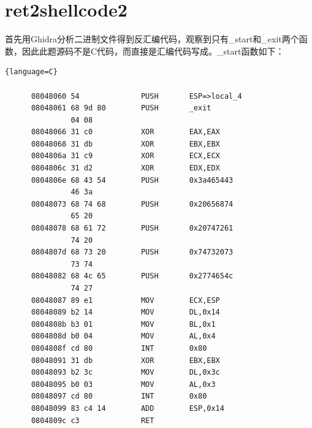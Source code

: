 \documentclass{article}
\begin{document}
\section{ret2shellcode2}
    首先用Ghidra分析二进制文件得到反汇编代码，观察到只有\_start和\_exit两个函数，因此此题源码不是C代码，而直接是汇编代码写成。\_start函数如下：
    	\begin{lstlisting}{language=C}
   
      08048060 54              PUSH       ESP=>local_4
      08048061 68 9d 80        PUSH       _exit
               04 08
      08048066 31 c0           XOR        EAX,EAX
      08048068 31 db           XOR        EBX,EBX
      0804806a 31 c9           XOR        ECX,ECX
      0804806c 31 d2           XOR        EDX,EDX
      0804806e 68 43 54        PUSH       0x3a465443
               46 3a
      08048073 68 74 68        PUSH       0x20656874
               65 20
      08048078 68 61 72        PUSH       0x20747261
               74 20
      0804807d 68 73 20        PUSH       0x74732073
               73 74
      08048082 68 4c 65        PUSH       0x2774654c
               74 27
      08048087 89 e1           MOV        ECX,ESP
      08048089 b2 14           MOV        DL,0x14
      0804808b b3 01           MOV        BL,0x1
      0804808d b0 04           MOV        AL,0x4
      0804808f cd 80           INT        0x80
      08048091 31 db           XOR        EBX,EBX
      08048093 b2 3c           MOV        DL,0x3c
      08048095 b0 03           MOV        AL,0x3
      08048097 cd 80           INT        0x80
      08048099 83 c4 14        ADD        ESP,0x14
      0804809c c3              RET
      
    	\end{lstlisting}
    
\end{document}
